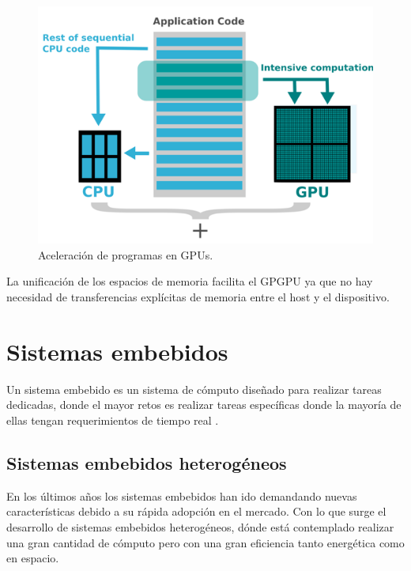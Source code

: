    \begin{figure}[ht]
      \centering
        \includegraphics[scale=0.9]{img/gpgpu}
        \caption{Aceleración de programas en GPUs\cite{gpgpu}.}
        \label{fig:gpgpu}
    \end{figure}

    La unificación de los espacios de memoria facilita el GPGPU ya que no hay necesidad de transferencias explícitas de memoria entre el host y el dispositivo.


    \section{Sistemas embebidos}

    Un sistema embebido es un sistema de cómputo diseñado para realizar tareas dedicadas, donde el mayor retos es realizar tareas específicas donde la mayoría de ellas tengan requerimientos de tiempo real \cite{LimPree}.

    \subsection{Sistemas embebidos heterogéneos}
    \vspace{0.3cm}
    En los últimos años los sistemas embebidos han ido demandando nuevas características debido a su rápida adopción en el mercado. Con lo que surge el desarrollo de sistemas embebidos heterogéneos, dónde está contemplado realizar una gran cantidad de cómputo pero con una gran eficiencia tanto energética como en espacio.
    \vspace{0.3cm}

